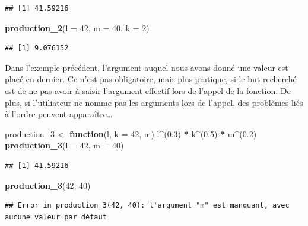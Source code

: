 \documentclass[
  11pt,
]{book}
\newenvironment{Shaded}{\begin{snugshade}}{\end{snugshade}}
\newcommand{\ControlFlowTok}[1]{\textcolor[rgb]{0.13,0.29,0.53}{\textbf{#1}}}
\newcommand{\DataTypeTok}[1]{\textcolor[rgb]{0.13,0.29,0.53}{#1}}
\newcommand{\DecValTok}[1]{\textcolor[rgb]{0.00,0.00,0.81}{#1}}
\newcommand{\FloatTok}[1]{\textcolor[rgb]{0.00,0.00,0.81}{#1}}
\newcommand{\KeywordTok}[1]{\textcolor[rgb]{0.13,0.29,0.53}{\textbf{#1}}}
\newcommand{\NormalTok}[1]{#1}
\newcommand{\OperatorTok}[1]{\textcolor[rgb]{0.81,0.36,0.00}{\textbf{#1}}}
\newcommand{\StringTok}[1]{\textcolor[rgb]{0.31,0.60,0.02}{#1}}
\numberwithin{equation}{section}
\numberwithin{countremarque}{section}
\begin{document}
\begin{lstlisting}
## [1] 41.59216
\end{lstlisting}

\begin{Shaded}
\begin{Highlighting}[]
\KeywordTok{production\_2}\NormalTok{(}\DataTypeTok{l =} \DecValTok{42}\NormalTok{, }\DataTypeTok{m =} \DecValTok{40}\NormalTok{, }\DataTypeTok{k =} \DecValTok{2}\NormalTok{)}
\end{Highlighting}
\end{Shaded}

\begin{lstlisting}
## [1] 9.076152
\end{lstlisting}

Dans l'exemple précédent, l'argument auquel nous avons donné une valeur est placé en dernier. Ce n'est pas obligatoire, mais plus pratique, si le but recherché est de ne pas avoir à saisir l'argument effectif lors de l'appel de la fonction. De plus, si l'utiliateur ne nomme pas les arguments lors de l'appel, des problèmes liés à l'ordre peuvent apparaître\ldots{}

\begin{Shaded}
\begin{Highlighting}[]
\NormalTok{production\_}\DecValTok{3}\NormalTok{ \textless{}{-}}\StringTok{ }\ControlFlowTok{function}\NormalTok{(l, }\DataTypeTok{k =} \DecValTok{42}\NormalTok{, m) l}\OperatorTok{\^{}}\NormalTok{(}\FloatTok{0.3}\NormalTok{) }\OperatorTok{*}\StringTok{ }\NormalTok{k}\OperatorTok{\^{}}\NormalTok{(}\FloatTok{0.5}\NormalTok{) }\OperatorTok{*}\StringTok{ }\NormalTok{m}\OperatorTok{\^{}}\NormalTok{(}\FloatTok{0.2}\NormalTok{)}
\KeywordTok{production\_3}\NormalTok{(}\DataTypeTok{l =} \DecValTok{42}\NormalTok{, }\DataTypeTok{m =} \DecValTok{40}\NormalTok{)}
\end{Highlighting}
\end{Shaded}

\begin{lstlisting}
## [1] 41.59216
\end{lstlisting}

\begin{Shaded}
\begin{Highlighting}[]
\KeywordTok{production\_3}\NormalTok{(}\DecValTok{42}\NormalTok{, }\DecValTok{40}\NormalTok{)}
\end{Highlighting}
\end{Shaded}

\begin{lstlisting}
## Error in production_3(42, 40): l'argument "m" est manquant, avec aucune valeur par défaut
\end{lstlisting}
\end{document}
